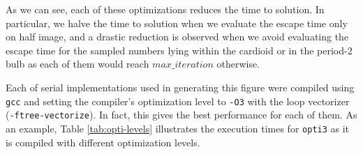 \documentclass[11pt,a4paper]{article}
\begin{document}
\noindent
As we can see, each of these optimizations reduces the time to solution.
In particular, we halve the time to solution when we evaluate the escape time only on half image, and a drastic reduction is observed when we avoid evaluating the escape time for the sampled numbers lying within the cardioid or in the period-2 bulb as each of them would reach $max\_iteration$ otherwise.

Each of serial implementations used in generating this figure were compiled using \texttt{gcc} and setting the compiler's optimization level to \texttt{-O3} with the loop vectorizer (\texttt{-ftree-vectorize}).
In fact, this gives the best performance for each of them. 
As an example, Table \ref{tab:opti-levels} illustrates the execution times for \texttt{opti3} as it is compiled with different optimization levels.
\end{document}
